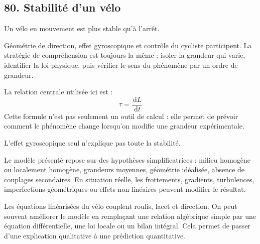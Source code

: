 \documentclass[11pt,a4paper]{article}
\newcommand{\dd}{\,\mathrm d}
\begin{document}
\subsection{80. Stabilité d'un vélo}

\begin{exemplebox}
Un vélo en mouvement est plus stable qu'à l'arrêt.
\end{exemplebox}

\begin{methodebox}
Géométrie de direction, effet gyroscopique et contrôle du cycliste participent.
La stratégie de compréhension est toujours la même : isoler la grandeur qui varie, identifier la loi physique, puis vérifier le sens du phénomène par un ordre de grandeur.
\end{methodebox}

\begin{theorembox}
La relation centrale utilisée ici est :
\[
\tau=\frac{\dd L}{\dd t}
\]
Cette formule n'est pas seulement un outil de calcul : elle permet de prévoir comment le phénomène change lorsqu'on modifie une grandeur expérimentale.
\end{theorembox}

\begin{odgbox}
L'effet gyroscopique seul n'explique pas toute la stabilité.
\end{odgbox}

\begin{attentionbox}
Le modèle présenté repose sur des hypothèses simplificatrices : milieu homogène ou localement homogène, grandeurs moyennes, géométrie idéalisée, absence de couplages secondaires. En situation réelle, les frottements, gradients, turbulences, imperfections géométriques ou effets non linéaires peuvent modifier le résultat.
\end{attentionbox}

\begin{approfondissementbox}
Les équations linéarisées du vélo couplent roulis, lacet et direction.
On peut souvent améliorer le modèle en remplaçant une relation algébrique simple par une équation différentielle, une loi locale ou un bilan intégral. Cela permet de passer d'une explication qualitative à une prédiction quantitative.
\end{approfondissementbox}
\end{document}
